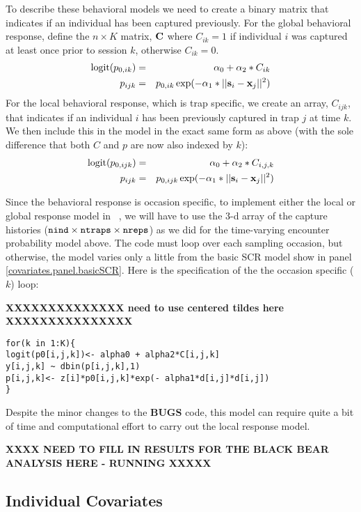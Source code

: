 To describe these behavioral models we need to create a binary matrix that indicates
if an individual has been captured previously.  For the global
behavioral response, define the $n \times K$ matrix,
${\bf C}$ where $C_{ik} =1$
if individual $i$ was captured at least once prior to session
$k$, otherwise $C_{ik} = 0$.
\begin{eqnarray*}
\mbox{logit}(p_{0,ik})& =& \alpha_{0} + \alpha_{2}*C_{ik} \\
p_{ijk} &= &p_{0,ik} \exp(- \alpha_{1}*||{\bf s}_{i}-{\bf x}_{j}||^2)
\end{eqnarray*}
For the local behavioral response, which is trap specific, we create
an array, $C_{ijk}$, that indicates if an individual $i$ has been
previously captured in trap $j$ at time $k$.  We then include this in
the model in the exact same form as above (with the sole difference that both $C$ and $p$ 
are now also indexed by $k$):
\begin{eqnarray*}
\mbox{logit}(p_{0,ijk}) &= &\alpha_{0} + \alpha_{2}*C_{i,j,k} \\
          p_{ijk} &= &  p_{0,ijk} \exp(- \alpha_{1}*||{\bf s}_{i}-{\bf x}_{j}||^2)
\end{eqnarray*}

Since the behavioral response is occasion specific, to implement either the local or global response model in \jags~, we will have to use the 3-d array of the
capture histories ($\mbox{\tt nind} \times \mbox{\tt ntraps} \times
\mbox{\tt nreps}$) as we did for the time-varying encounter probability
model above. The code must loop over each sampling occasion, but otherwise, the model
varies only a little from the basic SCR model show in panel \ref{covariates.panel.basicSCR}.  
Here is the specification of the the occasion specific ($k$) loop:

{\bf XXXXXXXXXXXXXX need to use centered tildes here XXXXXXXXXXXXXXX}
{\small
\begin{verbatim}
for(k in 1:K){
logit(p0[i,j,k])<- alpha0 + alpha2*C[i,j,k]
y[i,j,k] ~ dbin(p[i,j,k],1)
p[i,j,k]<- z[i]*p0[i,j,k]*exp(- alpha1*d[i,j]*d[i,j])
}
\end{verbatim}
}
Despite the minor changes to the {\bf BUGS} code, this model can require quite a bit of time and computational 
effort to carry out the local response model.  

{\bf XXXX NEED TO FILL IN RESULTS FOR THE BLACK BEAR ANALYSIS HERE -
  RUNNING XXXXX }


\subsection{Individual Covariates}
\label{covariates.sec.sex}



